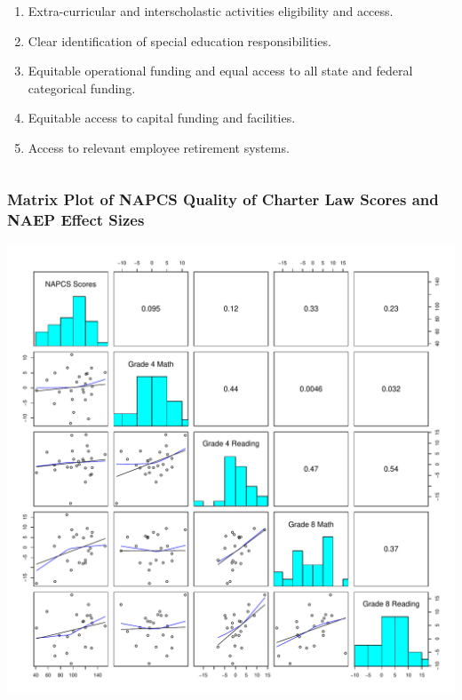 \documentclass[10pt,handout,mathserif]{beamer}
\begin{document}
\begin{frame}
{\begin{columns}
\begin{column}{0.5\textwidth}
\begin{enumerate}
            \item Extra-curricular and interscholastic activities eligibility and access.
            \item Clear identification of special education responsibilities.
            \item Equitable operational funding and equal access to all state and federal categorical funding.
            \item Equitable access to capital funding and facilities.
            \item Access to relevant employee retirement systems.
            \end{enumerate}
            \cite{NAPCS2010a}
        \end{column}
    \end{columns}
    }
\end{frame}

\begin{frame}[c]
	\frametitle{Matrix Plot of NAPCS Quality of Charter Law Scores and NAEP Effect Sizes}
	\begin{center}
	\includegraphics[height=.8\textheight,keepaspectratio]{../Figures2009/NAEPLawScoresMatrixPlot}
	\end{center}
\end{frame}
\end{document}
